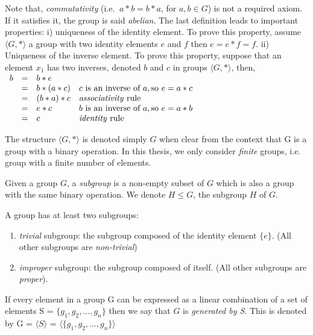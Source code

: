 Note that, \emph{commutativity} (i.e. $\ a * b = b * a$, for $a, b \in G$) is not a required axiom.
If it satisfies it, the group is said \emph{abelian}.
The last definition leads to important properties: i) uniqueness of the identity element. 
To prove this property, assume $\langle G, * \rangle$ a group with two identity elements $e$ and $f$ 
then $ e = e * f = f$.
ii) Uniqueness of the inverse element. To prove this property, suppose that an element $x_1$ has two inverses,
denoted $b$ and $c$ in groups $\langle G, * \rangle$, then,\\

 $\begin{array}{lcll}     
b & = & b * e & \\
& = & b * (a * c) & c \text{ is an inverse of } a, \text{so } e = a * c\\
& = & (b * a) * c &   \text{\emph{associativity} rule}\\
& = & e * c       & b \text{ is an inverse of } a, \text{so } e = a * b\\
& = & c           &   \text{\emph{identity} rule}
\end{array}$

The structure $\langle G, * \rangle$ is denoted simply $G$ when clear from the context that G is a group
with a binary operation. In this thesis, we only consider \emph{finite} groups, i.e. group with a finite number of elements.

\begin{definition}[Subgroup]
Given a group $G$, a \emph{subgroup} is a non-empty subset of $G$ which is also a group with 
the same binary operation. We denote $H \leq G$, the subgroup $H$ of $G$.
\end{definition}

A group has at least two subgroups: 
\begin{enumerate}[topsep=0pt,nolistsep]
	\item \emph{trivial} subgroup: the subgroup composed of the identity element $\{e\}$. (All other subgroups are \textit{non-trivial})
	\item \emph{improper} subgroup: the subgroup composed of itself. (All other subgroups are \emph{proper}).
\end{enumerate}

\begin{definition}
	If every element in a group G can be expressed as a linear combination
	of a set of elements S = $\{g_1, g_2, ..., g_n \}$ then we say that $G$ is 
	\textit{generated by S}. This is denoted by G = $\langle S \rangle$ =
	$\langle \{g_1, g_2, ..., g_n \} \rangle$ 
\end{definition}

